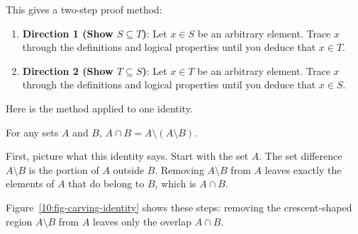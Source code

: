 This gives a two-step proof method:
\begin{enumerate}
\item \textbf{Direction 1 (Show $S \subseteq T$)}: Let $x \in S$ be an arbitrary element. Trace $x$ through the definitions and logical properties until you deduce that $x \in T$.
\item \textbf{Direction 2 (Show $T \subseteq S$)}: Let $x \in T$ be an arbitrary element. Trace $x$ through the definitions and logical properties until you deduce that $x \in S$.
\end{enumerate}

Here is the method applied to one identity.

\begin{theorem}
For any sets $A$ and $B$, $A \cap B = A \setminus (A \setminus B)$.
\end{theorem}

First, picture what this identity says. Start with the set $A$. The set difference $A \setminus B$ is the portion of $A$ outside $B$. Removing $A \setminus B$ from $A$ leaves exactly the elements of $A$ that do belong to $B$, which is $A \cap B$.

Figure~\ref{10:fig-carving-identity} shows these steps: removing the crescent-shaped region $A \setminus B$ from $A$ leaves only the overlap $A \cap B$.

